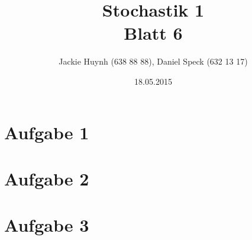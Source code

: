 \documentclass[10pt,a4paper]{article}
\title{\textbf{\huge Stochastik 1
\\\large Blatt 6}}
\author{Jackie Huynh (638 88 88), Daniel Speck (632 13 17)}
\date{18.05.2015}
\begin{document}
	\maketitle



	\section*{Aufgabe 1}
	
		
		
	\section*{Aufgabe 2}
	
	\newpage
	
	\section*{Aufgabe 3}
	
\end{document}
